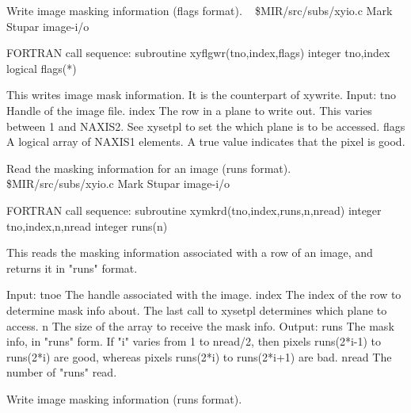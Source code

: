 %
\noindent Write image masking information (flags format).
\newline \ 
\newline {} \$MIR/src/subs/xyio.c
\newline {} Mark Stupar
\newline {} image-i/o
\par{\tenpoint
{\eightpoint\begintt
FORTRAN call sequence:
        subroutine xyflgwr(tno,index,flags)
        integer tno,index
        logical flags(*)

  This writes image mask information. It is the counterpart of xywrite.
  Input:
    tno         Handle of the image file.
    index       The row in a plane to write out. This varies between 1 and
                NAXIS2. See xysetpl to set the which plane is to be
                accessed.
    flags       A logical array of NAXIS1 elements. A true value indicates
                that the pixel is good.                                 
\endtt}
\par}
%
\noindent Read the masking information for an image (runs format).
\newline \ 
\newline \abox{File:} \$MIR/src/subs/xyio.c
\newline {} Mark Stupar
\newline \abox{Keywords:} image-i/o
\par{\tenpoint
{\eightpoint\begintt
FORTRAN call sequence:
        subroutine xymkrd(tno,index,runs,n,nread)
        integer tno,index,n,nread
        integer runs(n)

  This reads the masking information associated with a row of an image,
  and returns it in "runs" format. 

  Input:
    tnoe        The handle associated with the image.
    index       The index of the row to determine mask info about. The
                last call to xysetpl determines which plane to access.
    n           The size of the array to receive the mask info.
  Output:
    runs        The mask info, in "runs" form. If "i" varies from 1 to
                nread/2, then pixels runs(2*i-1) to runs(2*i) are
                good, whereas pixels runs(2*i) to runs(2*i+1) are bad.
    nread       The number of "runs" read.                              
\endtt}
\par}
%
\noindent Write image masking information (runs format).
\newline \ 

